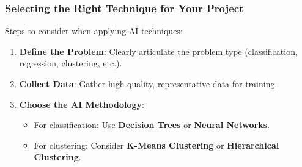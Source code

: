 \documentclass[aspectratio=169]{beamer}
\begin{document}
\begin{frame}[fragile]
  \frametitle{Selecting the Right Technique for Your Project}
  Steps to consider when applying AI techniques:
  \begin{enumerate}
    \item \textbf{Define the Problem}: Clearly articulate the problem type (classification, regression, clustering, etc.).
    \item \textbf{Collect Data}: Gather high-quality, representative data for training.
    \item \textbf{Choose the AI Methodology}: 
      \begin{itemize}
        \item For classification: Use \textbf{Decision Trees} or \textbf{Neural Networks}.
        \item For clustering: Consider \textbf{K-Means Clustering} or \textbf{Hierarchical Clustering}.
      \end{itemize}
  \end{enumerate}
\end{frame}
\end{document}
